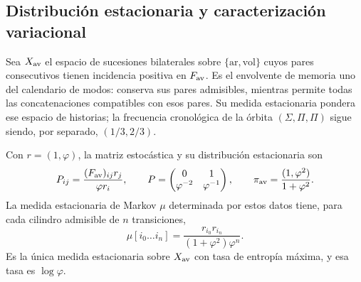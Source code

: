 \subsection{Distribución estacionaria y caracterización variacional}
\label{v:subsec:parry-explicita}

Sea \(X_{\rm av}\) el espacio de sucesiones bilaterales sobre
\(\{\mathrm{ar},\mathrm{vol}\}\) cuyos pares consecutivos tienen
incidencia positiva en \(F_{\rm av}\). Es el envolvente de memoria uno
del calendario de modos: conserva sus pares admisibles, mientras permite
todas las concatenaciones compatibles con esos pares. Su medida
estacionaria pondera ese espacio de historias; la frecuencia cronológica
de la órbita \((\Sigma,\Pi,\Pi)\) sigue siendo, por separado,
\((1/3,2/3)\).

\begin{proposition}
\label{v:prop:parry-explicita}
Con \(r=(1,\varphi)\), la matriz estocástica y su distribución
estacionaria son
\begin{equation}
 P_{ij}=\frac{(F_{\rm av})_{ij}r_j}{\varphi r_i},\qquad
 P=\begin{pmatrix}0&1\\\varphi^{-2}&\varphi^{-1}\end{pmatrix},
 \qquad
 \pi_{\rm av}=\frac{(1,\varphi^2)}{1+\varphi^2}.
 \label{v:eq:parry-transicion-estacionaria}
\end{equation}
La medida estacionaria de Markov \(\mu\) determinada por estos datos
tiene, para cada cilindro admisible de \(n\) transiciones,
\begin{equation}
 \mu[i_0\ldots i_n]
 =\frac{r_{i_0}r_{i_n}}{(1+\varphi^2)\varphi^n}.
 \label{v:eq:parry-cilindros}
\end{equation}
Es la única medida estacionaria sobre \(X_{\rm av}\) con tasa de
entropía máxima, y esa tasa es \(\log\varphi\).
\end{proposition}

